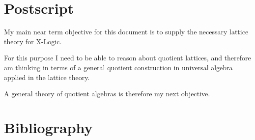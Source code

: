 
\section{Postscript}\label{POSTSCRIPT}

My main near term objective for this document is to supply the necessary lattice theory for X-Logic.

For this purpose I need to be able to reason about quotient lattices, and therefore am thinking in terms of a general quotient construction in universal algebra applied in the lattice theory.

A general theory of quotient algebras is therefore my next objective.

\appendix

\vfill





\pagebreak

\section*{Bibliography}\label{BIBLIOGRAPHY}

{\def\section*#1{\ignore{#1}}
\raggedright


} %

{
{\small\printindex}}


